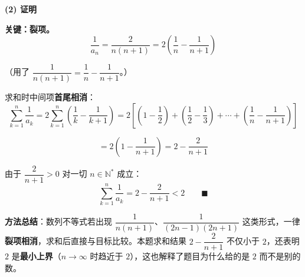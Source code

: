 \begin{answer}
\par\medskip

\textbf{(2) 证明}

\textbf{关键：裂项。}
\nopagebreak[4]
\[\frac1{a_n}=\frac2{n(n+1)}=2\left(\frac1n-\frac1{n+1}\right)\]

（用了 $\dfrac1{n(n+1)}=\dfrac1n-\dfrac1{n+1}$。）

求和时中间项\textbf{首尾相消}：
\nopagebreak[4]
\[\sum_{k=1}^n\frac1{a_k}=2\sum_{k=1}^n\left(\frac1k-\frac1{k+1}\right)=2\left[\left(1-\frac12\right)+\left(\frac12-\frac13\right)+\cdots+\left(\frac1n-\frac1{n+1}\right)\right]\]

\nopagebreak[4]
\[=2\left(1-\frac1{n+1}\right)=2-\frac2{n+1}\]

由于 $\dfrac2{n+1}>0$ 对一切 $n\in\mathbb N^{*}$ 成立：
\nopagebreak[4]
\[\sum_{k=1}^n\frac1{a_k}=2-\frac2{n+1}<2\qquad\blacksquare\]

\begin{gktip}
\textbf{方法总结}：数列不等式若出现 $\dfrac1{n(n+1)}$、$\dfrac1{(2n-1)(2n+1)}$ 这类形式，一律\textbf{裂项相消}，求和后直接与目标比较。本题求和结果 $2-\dfrac2{n+1}$ 不仅小于 $2$，还表明 $2$ 是\textbf{最小上界}（$n\to\infty$ 时趋近于 $2$），这也解释了题目为什么给的是 $2$ 而不是别的数。
\end{gktip}



\par\medskip

\end{answer}
